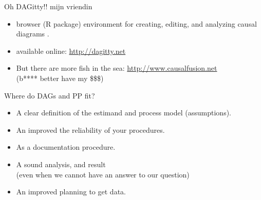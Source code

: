 \begin{frame}
\begin{columns}
\begin{column}{0.5\textwidth}
\begin{figure}
			\end{figure}
			\begin{figure}
			\end{figure}
		\end{column}
	\end{columns}
\end{frame}
%
%
\begin{lhframe}[rhgraphic={\texttt{[image: DAGitty.png]}}]
	{Oh DAGitty!! mijn vriendin}
	
	\begin{itemize}
		\item browser (R package) environment for creating, editing, and analyzing causal diagrams \cite{Textor_et_al_2016}.
		\item available online: \textcolor{blue}{\url{http://dagitty.net}}
		\item But there are more fish in the sea: \textcolor{blue}{\url{http://www.causalfusion.net}} \cite{Bareinboim_et_al_2016} \\
		{\small (b**** better have my \$\$\$)}
	\end{itemize}
\end{lhframe}
%
%
\begin{lhframe}[rhgraphic={\texttt{[image: DAG\_to\_research.png]}}]
	{Where do DAGs and PP fit?}
	\begin{itemize}
		\item A clear definition of the estimand and process model (assumptions).
		\item An improved the reliability of your procedures.
		\item As a documentation procedure.
	\end{itemize}
	\begin{itemize}
		\item A sound analysis, and result \\
		{\small \alert{(even when we cannot have an answer to our question)} }
		\item An improved planning to get data.
	\end{itemize}
\end{lhframe}
%
%